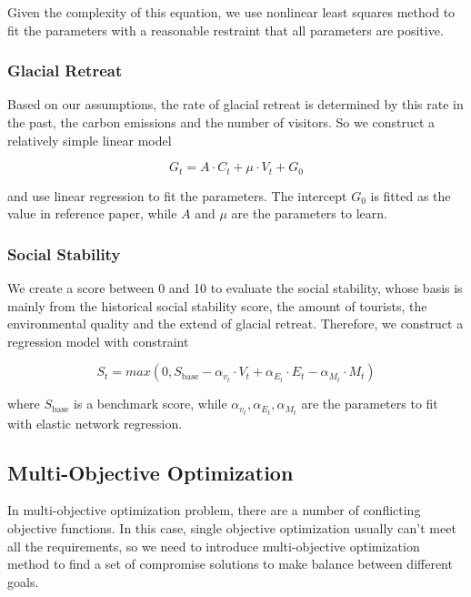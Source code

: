 \documentclass{mcmthesis}
\begin{document}
Given the complexity of this equation, we use nonlinear least squares method to fit the parameters with 
a reasonable restraint that all parameters are positive.


\subsubsection{Glacial Retreat}
Based on our assumptions, the rate of glacial retreat is determined by this rate in the past, the carbon emissions and the number of visitors.
So we construct a relatively simple linear model

\begin{equation}
  G_t = A \cdot C_t + \mu \cdot V_t + G_0
\end{equation}

and use linear regression to fit the parameters. The intercept $G_0$ is fitted as the value in reference paper, 
while $A$ and $\mu$ are the parameters to learn.

\subsubsection{Social Stability}
We create a score between 0 and 10 to evaluate the social stability, whose basis is mainly from 
the historical social stability score, the amount of tourists, the environmental quality and the extend of glacial retreat.
Therefore, we construct a regression model with constraint

\begin{equation}
  S_t = max\left(0, S_{\text{base}} - \alpha_{v_t} \cdot V_t + \alpha_{E_t} \cdot E_t - \alpha_{M_t} \cdot M_t\right)
\end{equation}

where $S_{\text{base}}$ is a benchmark score, while $\alpha_{v_t}, \alpha_{E_t}, \alpha_{M_t}$ are the parameters to fit 
with elastic network regression.

\subsection{Multi-Objective Optimization}
In multi-objective optimization problem, there are a number of conflicting objective functions. In this case, 
single objective optimization usually can't meet all the requirements, so we need to introduce multi-objective 
optimization method to find a set of compromise solutions to make balance between different goals.
\end{document}
